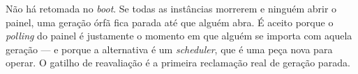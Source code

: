\begin{limitacao}
Não há retomada no \emph{boot}. Se todas as instâncias morrerem e ninguém abrir o
painel, uma geração órfã fica parada até que alguém abra. É aceito porque o
\emph{polling} do painel é justamente o momento em que alguém se importa com
aquela geração --- e porque a alternativa é um \emph{scheduler}, que é uma peça
nova para operar. O gatilho de reavaliação é a primeira reclamação real de
geração parada.
\end{limitacao}
